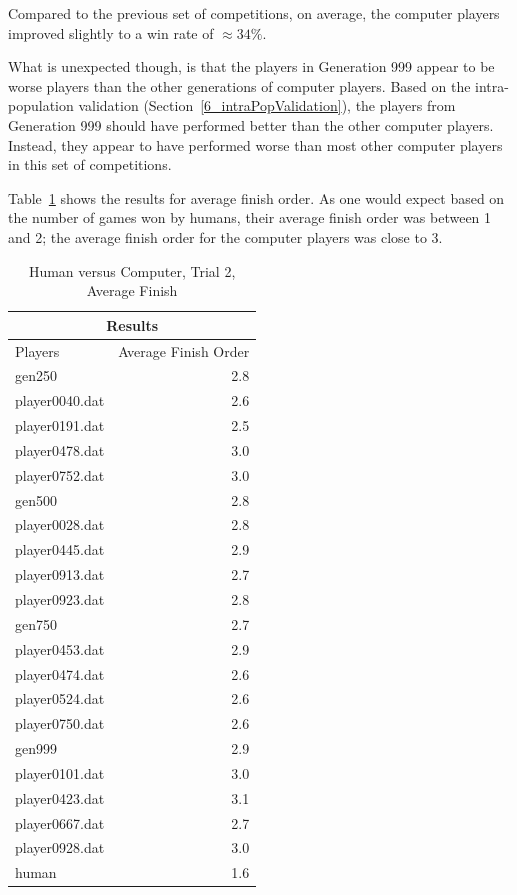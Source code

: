 Compared to the previous set of competitions, on average, the computer players
improved slightly to a win rate of \(\approx34\%\).

What is unexpected though, is that the players in Generation 999 appear to be
worse players than the other generations of computer players. Based on the
intra-population validation (Section~\ref{6_intraPopValidation}), the players
from Generation 999 should have performed better than the other computer
players. Instead, they appear to have performed worse than most other
computer players in this set of competitions.

Table~\ref{tab:human_rga_2b} shows the results for average finish order. As one
would expect based on the number of games won by humans, their average finish
order was between 1 and 2; the average finish order for the computer players was
close to 3.

\begin{table}[htbp]
  \centering
  \caption{Human versus Computer, Trial 2, Average Finish}
    \begin{tabular}{lr}
    \toprule
    \multicolumn{2}{c}{Results} \\
    \midrule
    Players & Average Finish Order \\
    \multicolumn{1}{l}{gen250} & 2.8 \\
    \multicolumn{1}{l}{player0040.dat} & 2.6 \\
    \multicolumn{1}{l}{player0191.dat} & 2.5 \\
    \multicolumn{1}{l}{player0478.dat} & 3.0 \\
    \multicolumn{1}{l}{player0752.dat} & 3.0 \\
    \multicolumn{1}{l}{gen500} & 2.8 \\
    \multicolumn{1}{l}{player0028.dat} & 2.8 \\
    \multicolumn{1}{l}{player0445.dat} & 2.9 \\
    \multicolumn{1}{l}{player0913.dat} & 2.7 \\
    \multicolumn{1}{l}{player0923.dat} & 2.8 \\
    \multicolumn{1}{l}{gen750} & 2.7 \\
    \multicolumn{1}{l}{player0453.dat} & 2.9 \\
    \multicolumn{1}{l}{player0474.dat} & 2.6 \\
    \multicolumn{1}{l}{player0524.dat} & 2.6 \\
    \multicolumn{1}{l}{player0750.dat} & 2.6 \\
    \multicolumn{1}{l}{gen999} & 2.9 \\
    \multicolumn{1}{l}{player0101.dat} & 3.0 \\
    \multicolumn{1}{l}{player0423.dat} & 3.1 \\
    \multicolumn{1}{l}{player0667.dat} & 2.7 \\
    \multicolumn{1}{l}{player0928.dat} & 3.0 \\
    \multicolumn{1}{l}{human} & 1.6 \\
    \bottomrule
    \end{tabular}%
  \label{tab:human_rga_2b}%
\end{table}%

